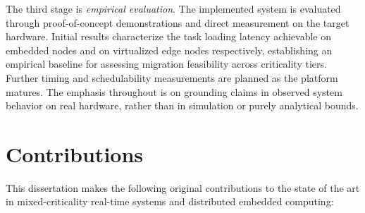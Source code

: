 The third stage is \emph{empirical evaluation}. The implemented system is evaluated
through proof-of-concept demonstrations and direct measurement on the target hardware.
Initial results characterize the task loading latency achievable on embedded nodes
and on virtualized edge nodes respectively, establishing an empirical baseline for
assessing migration feasibility across criticality tiers. Further timing and
schedulability measurements are planned as the platform matures. The emphasis
throughout is on grounding claims in observed system behavior on real hardware,
rather than in simulation or purely analytical bounds.

\section{Contributions}
\label{sec:contributions}

This dissertation makes the following original contributions to the state of the art
in mixed-criticality real-time systems and distributed embedded computing:

